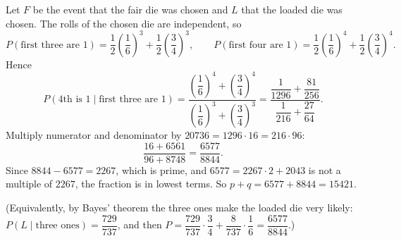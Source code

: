 Let $F$ be the event that the fair die was chosen and $L$ that the loaded die was chosen. The rolls of the chosen die are independent, so
\[P(\text{first three are }1)=\dfrac12\left(\dfrac16\right)^3+\dfrac12\left(\dfrac34\right)^3,\qquad P(\text{first four are }1)=\dfrac12\left(\dfrac16\right)^4+\dfrac12\left(\dfrac34\right)^4.\]
Hence
\[P(\text{4th is }1\mid\text{first three are }1)=\dfrac{\left(\dfrac16\right)^4+\left(\dfrac34\right)^4}{\left(\dfrac16\right)^3+\left(\dfrac34\right)^3}=\dfrac{\dfrac1{1296}+\dfrac{81}{256}}{\dfrac1{216}+\dfrac{27}{64}}.\]
Multiply numerator and denominator by $20736=1296\cdot16=216\cdot96$:
\[\dfrac{16+6561}{96+8748}=\dfrac{6577}{8844}.\]
Since $8844-6577=2267$, which is prime, and $6577=2267\cdot2+2043$ is not a multiple of $2267$, the fraction is in lowest terms. So $p+q=6577+8844=\boxed{15421}$.

(Equivalently, by Bayes' theorem the three ones make the loaded die very likely: $P(L\mid\text{three ones})=\dfrac{729}{737}$, and then $P=\dfrac{729}{737}\cdot\dfrac34+\dfrac{8}{737}\cdot\dfrac16=\dfrac{6577}{8844}$.)
